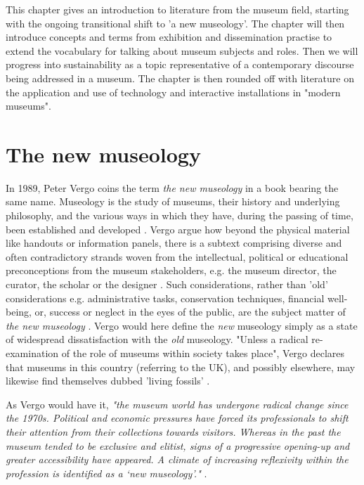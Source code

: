 
This chapter gives an introduction to literature from the museum field, starting with the ongoing transitional shift to 'a new museology'. The chapter will then introduce concepts and terms from exhibition and dissemination practise to extend the vocabulary for talking about museum subjects and roles. Then we will progress into sustainability as a topic representative of a contemporary discourse being addressed in a museum. The chapter is then rounded off with literature on the application and use of technology and interactive installations in "modern museums".

\section{The new museology}
In 1989, Peter Vergo coins the term \emph{the new museology} in a book bearing the same name. Museology is the study of museums, their history and underlying philosophy, and the various ways in which they have, during the passing of time, been established and developed \autocite[p.1]{vergo_museology_1989}. Vergo argue how beyond the physical material like handouts or information panels, there is a subtext comprising diverse and often contradictory strands woven from the intellectual, political or educational preconceptions from the museum stakeholders, e.g. the museum director, the curator, the scholar or the designer \autocite[p.3]{vergo_museology_1989}. Such considerations, rather than 'old' considerations e.g. administrative tasks, conservation techniques, financial well-being, or, success or neglect in the eyes of the public, are the subject matter of \emph{the new museology} \autocite[p.3]{vergo_museology_1989}. Vergo would here define the \emph{new} museology simply as a state of widespread dissatisfaction with the \emph{old} museology. "Unless a radical re-examination of the role of museums within society takes place", Vergo declares that museums in this country (referring to the UK), and possibly elsewhere, may likewise find themselves dubbed 'living fossils' \autocite[p.4]{vergo_museology_1989}.

As Vergo would have it, \emph{"the museum world has undergone radical change since the 1970s. Political and economic pressures have forced its professionals to shift their attention from their collections towards visitors. Whereas in the past the museum tended to be exclusive and elitist, signs of a progressive opening-up and greater accessibility have appeared. A climate of increasing reflexivity within the profession is identified as a ‘new museology’."} \autocite[p. 84]{ross_interpreting_2015}. 

